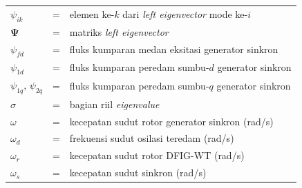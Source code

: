 \begin{tabular}{llp{3in}}
	$\psi_{ik}$            & \hspace{1.5cm} = & elemen ke-$k$ dari \textit{left eigenvector} mode ke-$i$ \\
	$\boldsymbol{\Psi}$    & \hspace{1.5cm} = & matriks \textit{left eigenvector} \\
	$\psi_{fd}$            & \hspace{1.5cm} = & fluks kumparan medan eksitasi generator sinkron \\
	$\psi_{1d}$            & \hspace{1.5cm} = & fluks kumparan peredam sumbu-$d$ generator sinkron \\
	$\psi_{1q},\,\psi_{2q}$ & \hspace{1.5cm} = & fluks kumparan peredam sumbu-$q$ generator sinkron \\
	$\sigma$               & \hspace{1.5cm} = & bagian riil \textit{eigenvalue} \\
	$\omega$               & \hspace{1.5cm} = & kecepatan sudut rotor generator sinkron (rad/s) \\
	$\omega_d$             & \hspace{1.5cm} = & frekuensi sudut osilasi teredam (rad/s) \\
	$\omega_r$             & \hspace{1.5cm} = & kecepatan sudut rotor DFIG-WT (rad/s) \\
	$\omega_s$             & \hspace{1.5cm} = & kecepatan sudut sinkron (rad/s) \\
\end{tabular}

\newpage

